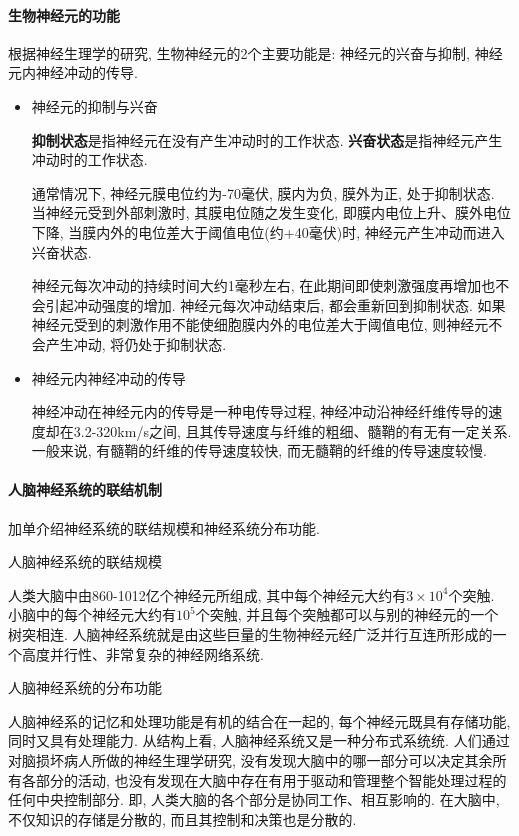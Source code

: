 \paragraph{生物神经元的功能}
根据神经生理学的研究, 生物神经元的2个主要功能是: 神经元的兴奋与抑制, 神经元内神经冲动的传导.
\begin{itemize}
\item {} 神经元的抑制与兴奋

\textbf{抑制状态}是指神经元在没有产生冲动时的工作状态. \textbf{兴奋状态}是指神经元产生冲动时的工作状态.

通常情况下, 神经元膜电位约为-70毫伏, 膜内为负, 膜外为正, 处于抑制状态. 当神经元受到外部刺激时, 其膜电位随之发生变化, 即膜内电位上升、膜外电位下降, 当膜内外的电位差大于阈值电位(约+40毫伏)时, 神经元产生冲动而进入兴奋状态.

\begin{remark}
  神经元每次冲动的持续时间大约1毫秒左右, 在此期间即使刺激强度再增加也不会引起冲动强度的增加. 神经元每次冲动结束后, 都会重新回到抑制状态. 如果神经元受到的刺激作用不能使细胞膜内外的电位差大于阈值电位, 则神经元不会产生冲动, 将仍处于抑制状态.
\end{remark}

\item {} 神经元内神经冲动的传导

神经冲动在神经元内的传导是一种电传导过程, 神经冲动沿神经纤维传导的速度却在3.2-320\si{km/s}之间, 且其传导速度与纤维的粗细、髓鞘的有无有一定关系. 一般来说, 有髓鞘的纤维的传导速度较快, 而无髓鞘的纤维的传导速度较慢.
\end{itemize}
\paragraph{人脑神经系统的联结机制} 加单介绍神经系统的联结规模和神经系统分布功能.

 人脑神经系统的联结规模

人类大脑中由860-1012亿个神经元所组成, 其中每个神经元大约有$3\times 10^4$个突触. 小脑中的每个神经元大约有$10^5$个突触, 并且每个突触都可以与别的神经元的一个树突相连. 人脑神经系统就是由这些巨量的生物神经元经广泛并行互连所形成的一个高度并行性、非常复杂的神经网络系统.

\quad {} 人脑神经系统的分布功能

人脑神经系的记忆和处理功能是有机的结合在一起的, 每个神经元既具有存储功能, 同时又具有处理能力. 从结构上看, 人脑神经系统又是一种分布式系统统. 人们通过对脑损坏病人所做的神经生理学研究, 没有发现大脑中的哪一部分可以决定其余所有各部分的活动, 也没有发现在大脑中存在有用于驱动和管理整个智能处理过程的任何中央控制部分. 即, 人类大脑的各个部分是协同工作、相互影响的. 在大脑中, 不仅知识的存储是分散的, 而且其控制和决策也是分散的.
